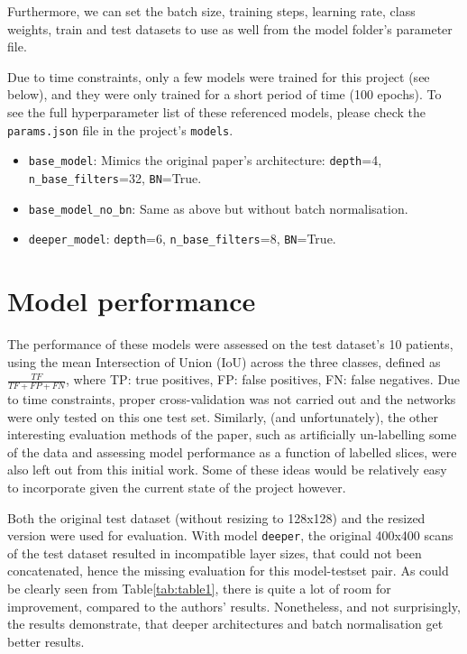 \documentclass{article}
\begin{document}
Furthermore, we can set the batch size, training steps, learning rate, class weights, train and test datasets to use as well from the model folder's parameter file.

Due to time constraints, only a few models were trained for this project (see below), and they were only trained for a short period of time (100 epochs). To see the full hyperparameter list of these referenced models, please check the \texttt{params.json} file in the project's \texttt{models}. 

\begin{itemize}
	\item \texttt{base\_model}: Mimics the original paper's architecture: \texttt{depth}=4, \texttt{n\_base\_filters}=32, \texttt{BN}=True.
	\item \texttt{base\_model\_no\_bn}: Same as above but without batch normalisation. 
	\item \texttt{deeper\_model}: \texttt{depth}=6, \texttt{n\_base\_filters}=8, \texttt{BN}=True.
\end{itemize}



\section{Model performance}

The performance of these models were assessed on the test dataset's 10 patients, using the mean Intersection of Union (IoU) across the three classes, defined as $\frac{TF}{TF + FP + FN}$, where TP: true positives, FP: false positives, FN: false negatives. Due to  time constraints, proper cross-validation was not carried out and the networks were only tested on this one test set. Similarly, (and unfortunately), the other interesting evaluation methods of the paper, such as artificially un-labelling some of the data and assessing model performance as a function of labelled slices, were also left out from this initial work. Some of these ideas would be relatively easy to incorporate given the current state of the project however.

Both the original test dataset (without resizing to 128x128) and the resized version were used for evaluation. With model \texttt{deeper}, the original 400x400 scans of the test dataset resulted in incompatible layer sizes, that could not been concatenated, hence the missing evaluation for this model-testset pair. As could be clearly seen from Table\ref{tab:table1}, there is quite a lot of room for improvement, compared to the authors' results. Nonetheless, and not surprisingly, the results demonstrate, that deeper architectures and batch normalisation get better results.
\end{document}

